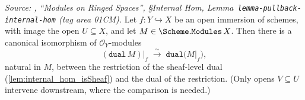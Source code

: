 \begin{lemma}\leanok
  \label{lem:dual_restrict_iso}
  \textit{Source: \cite{stacks-project}, ``Modules on Ringed Spaces'', \S Internal Hom,
  Lemma~\texttt{lemma-pullback-internal-hom} (tag area 01CM).}
  Let \(f : Y \hookrightarrow X\) be an open immersion of schemes, with image the open
  \(U \subseteq X\), and let \(M \in \Scheme.\mathtt{Modules}\,X\). Then there is a
  canonical isomorphism of \(\mathcal{O}_Y\)-modules
  \[
    (\mathtt{dual}\,M)\big|_f \;\xrightarrow{\ \sim\ }\; \mathtt{dual}\bigl(M|_f\bigr),
  \]
  natural in \(M\), between the restriction of the sheaf-level dual
  (\cref{lem:internal_hom_isSheaf}) and the dual of the restriction. (Only opens
  \(V \subseteq U\) intervene downstream, where the comparison is needed.)
\end{lemma}

